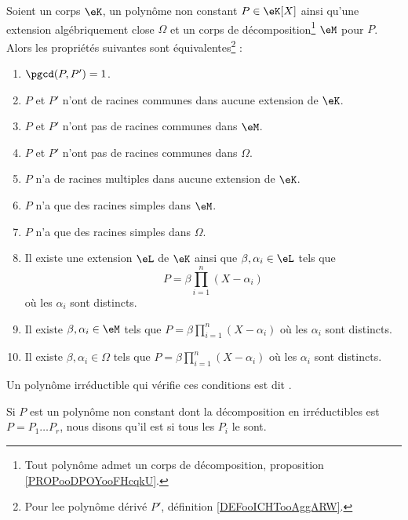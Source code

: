 \begin{propositionDef}       \label{PROPooPRGQooOkEmag}
	Soient un corps \( \eK\), un polynôme non constant \( P\in \eK[X]\) ainsi qu'une extension algébriquement close \( \Omega\) et un corps de décomposition\footnote{Tout polynôme admet un corps de décomposition, proposition \ref{PROPooDPOYooFHcqkU}.} \( \eM\) pour \( P\). Alors les propriétés suivantes sont équivalentes\footnote{Pour lee polynôme dérivé \( P'\), définition \ref{DEFooICHTooAggARW}.} :
	\begin{enumerate}
		\item       \label{ITEMooVMJLooUdZLQR}
		      \( \pgcd(P,P')=1\).
		\item
		      \( P\) et \( P'\) n'ont de racines communes dans aucune extension de \( \eK\).
		\item
		      \( P\) et \( P'\) n'ont pas de racines communes dans \( \eM\).
		\item
		      \( P\) et \( P'\) n'ont pas de racines communes dans \( \Omega\).
		\item       \label{ITEMooARPLooBoUrxX}
		      \( P\) n'a de racines multiples dans aucune extension de \( \eK\).
		\item
		      \( P\) n'a que des racines simples dans \( \eM\).
		\item
		      \( P\) n'a que des racines simples dans \( \Omega\).
		\item
		      Il existe une extension \( \eL\) de \( \eK\) ainsi que \( \beta,\alpha_i\in \eL\) tels que
		      \begin{equation}
			      P=\beta\prod_{i=1}^n(X-\alpha_i)
		      \end{equation}
		      où les \( \alpha_i\) sont distincts.
		\item
		      Il existe \( \beta,\alpha_i\in \eM\) tels que $P=\beta\prod_{i=1}^n(X-\alpha_i)$ où les \( \alpha_i\) sont distincts.
		\item
		      Il existe \( \beta,\alpha_i\in \Omega\) tels que $P=\beta\prod_{i=1}^n(X-\alpha_i)$ où les \( \alpha_i\) sont distincts.
	\end{enumerate}
	Un polynôme irréductible qui vérifie ces conditions est dit .

	Si \( P\) est un polynôme non constant dont la décomposition en irréductibles est \( P=P_1\ldots P_r\), nous disons qu'il est  si tous les \( P_i\) le sont.
\end{propositionDef}


